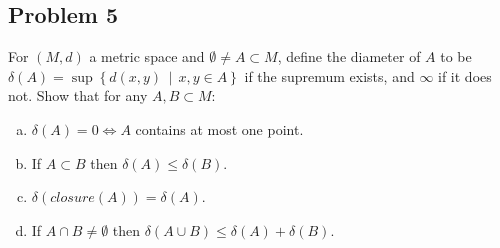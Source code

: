 \documentclass[12pt]{article}
\newcommand\setb[1]{\left \{ #1 \right \}}
\theoremstyle{definition}
\begin{document}
\subsection{Problem 5}
For $(M,d)$ a metric space and $\emptyset \neq A \subset M$, define the diameter of $A$ to be $\delta(A) = \sup \setb{ d(x,y) \, \middle| \, x,y \in A }$ if the supremum exists, and $\infty$ if it does not. Show that for any $A , B \subset M$:
\begin{enumerate}[(a)]
    \item $\delta(A) = 0 \Leftrightarrow A$ contains at most one point.
    \item If $A \subset B$ then $\delta(A) \leq \delta(B)$.
    \item $\delta(closure(A)) = \delta(A)$.
    \item If $A \cap B \neq \emptyset$ then $\delta(A \cup B) \leq \delta(A) + \delta(B)$.
\end{enumerate}
\end{document}
